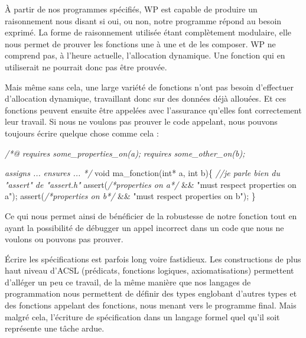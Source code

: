 \documentclass[12pt,francais,]{scrbook}
\newenvironment{Shaded}{}{}
\newcommand{\DataTypeTok}[1]{\textcolor[rgb]{0.56,0.13,0.00}{{#1}}}
\newcommand{\StringTok}[1]{\textcolor[rgb]{0.25,0.44,0.63}{{#1}}}
\newcommand{\CommentTok}[1]{\textcolor[rgb]{0.38,0.63,0.69}{\textit{{#1}}}}
\newcommand{\NormalTok}[1]{{#1}}
\begin{document}
À partir de nos programmes spécifiés, WP est capable de produire un
raisonnement nous disant si oui, ou non, notre programme répond au
besoin exprimé. La forme de raisonnement utilisée étant complètement
modulaire, elle nous permet de prouver les fonctions une à une et de les
composer. WP ne comprend pas, à l'heure actuelle, l'allocation
dynamique. Une fonction qui en utiliserait ne pourrait donc pas être
prouvée.

Mais même sans cela, une large variété de fonctions n'ont pas besoin
d'effectuer d'allocation dynamique, travaillant donc sur des données
déjà allouées. Et ces fonctions peuvent ensuite être appelées avec
l'assurance qu'elles font correctement leur travail. Si nous ne voulons
pas prouver le code appelant, nous pouvons toujours écrire quelque chose
comme cela :

\begin{footnotesize}\begin{Shaded}
\begin{Highlighting}[]
\CommentTok{/*@}
\CommentTok{  requires some_properties_on(a);}
\CommentTok{  requires some_other_on(b);}

\CommentTok{  assigns ...}
\CommentTok{  ensures ...}
\CommentTok{*/}
\DataTypeTok{void} \NormalTok{ma_fonction(}\DataTypeTok{int}\NormalTok{* a, }\DataTypeTok{int} \NormalTok{b)\{}
  \CommentTok{//je parle bien du "assert" de "assert.h"}
  \NormalTok{assert(}\CommentTok{/*properties on a*/} \NormalTok{&& }\StringTok{"must respect properties on a"}\NormalTok{);  }
  \NormalTok{assert(}\CommentTok{/*properties on b*/} \NormalTok{&& }\StringTok{"must respect properties on b"}\NormalTok{);}
\NormalTok{\}}
\end{Highlighting}
\end{Shaded}\end{footnotesize}

Ce qui nous permet ainsi de bénéficier de la robustesse de notre
fonction tout en ayant la possibilité de débugger un appel incorrect
dans un code que nous ne voulons ou pouvons pas prouver.

Écrire les spécifications est parfois long voire fastidieux. Les
constructions de plus haut niveau d'ACSL (prédicats, fonctions logiques,
axiomatisations) permettent d'alléger un peu ce travail, de la même
manière que nos langages de programmation nous permettent de définir des
types englobant d'autres types et des fonctions appelant des fonctions,
nous menant vers le programme final. Mais malgré cela, l'écriture de
spécification dans un langage formel quel qu'il soit représente une
tâche ardue.
\end{document}
